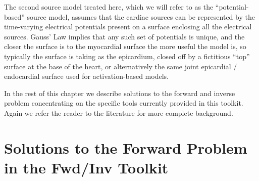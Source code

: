 The second source model treated here, which we will refer to as the
``potential-based'' source model, assumes that the cardiac sources can be
represented by the time-varying electrical potentials present on a surface
enclosing all the electrical sources. Gauss' Law implies that any such set
of potentials is unique, and the closer the surface is to the myocardial
surface the more useful the model is, so typically the surface is taking as
the epicardium, closed off by a fictitious ``top'' surface at the base of
the heart, or alternatively the same joint epicardial / endocardial surface
used for activation-based models.

In the rest of this chapter we describe solutions to the forward and
inverse problem concentrating on the specific tools currently provided in
this toolkit. Again we refer the reader to the literature for more complete
background. 

\section{Solutions to the Forward Problem in the Fwd/Inv Toolkit}


